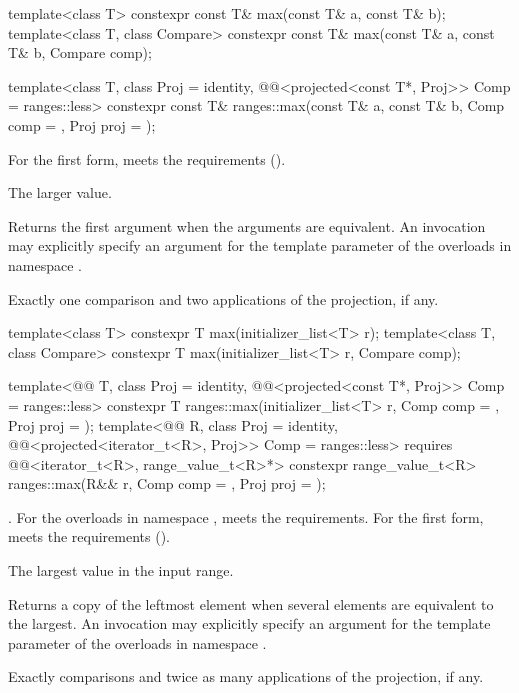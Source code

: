 %
\begin{itemdecl}
template<class T>
  constexpr const T& max(const T& a, const T& b);
template<class T, class Compare>
  constexpr const T& max(const T& a, const T& b, Compare comp);

template<class T, class Proj = identity,
         @@<projected<const T*, Proj>> Comp = ranges::less>
  constexpr const T& ranges::max(const T& a, const T& b, Comp comp = {}, Proj proj = {});
\end{itemdecl}

\begin{itemdescr}
\pnum
\expects
For the first form,  meets the
 requirements ().

\pnum
\returns
The larger value.

\pnum
\remarks
Returns the first argument when the arguments are equivalent.
An invocation may explicitly specify
an argument for the template parameter 
of the overloads in namespace .

\pnum
\complexity
Exactly one comparison and two applications of the projection, if any.
\end{itemdescr}

%
\begin{itemdecl}
template<class T>
  constexpr T max(initializer_list<T> r);
template<class T, class Compare>
  constexpr T max(initializer_list<T> r, Compare comp);

template<@@ T, class Proj = identity,
         @@<projected<const T*, Proj>> Comp = ranges::less>
  constexpr T ranges::max(initializer_list<T> r, Comp comp = {}, Proj proj = {});
template<@@ R, class Proj = identity,
         @@<projected<iterator_t<R>, Proj>> Comp = ranges::less>
  requires @@<iterator_t<R>, range_value_t<R>*>
  constexpr range_value_t<R>
    ranges::max(R&& r, Comp comp = {}, Proj proj = {});
\end{itemdecl}

\begin{itemdescr}
\pnum
\expects
{}.
For the overloads in namespace ,
 meets the  requirements.
For the first form,  meets the 
requirements ().

\pnum
\returns
The largest value in the input range.

\pnum
\remarks
Returns a copy of the leftmost element
when several elements are equivalent to the largest.
An invocation may explicitly specify
an argument for the template parameter 
of the overloads in namespace .

\pnum
\complexity
Exactly  comparisons
and twice as many applications of the projection, if any.
\end{itemdescr}


